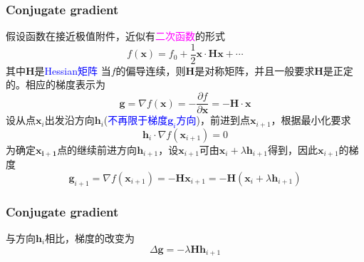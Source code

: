 {\frame
{
	\frametitle{\textrm{Conjugate gradient}}
	假设函数在接近极值附件，近似有\textcolor{magenta}{二次函数}的形式
	\begin{displaymath}
		f(\mathbf{x})=f_0+\frac12\mathbf{x}\cdot\mathbf{H}{\mathbf{x}}+\cdots
	\end{displaymath}
	其中$\mathbf{H}$是\textcolor{blue}{\textrm{Hessian}矩阵}%
	当$f$的偏导连续，则$\mathbf{H}$是对称矩阵，并且一般要求$\mathbf{H}$是正定的。相应的梯度表示为
	\begin{displaymath}
		\mathbf{g}=\nabla f(\mathbf{x})=-\dfrac{\partial f}{\partial\mathbf{x}}=-\mathbf{H}\cdot\mathbf{x}
	\end{displaymath}
	\vskip 20pt
	设从点$\mathbf{x}_i$出发沿方向$\mathbf{h}_i$(\textcolor{blue}{不再限于梯度$\mathbf{g}_i$方向})，前进到点$\mathbf{x}_{i+1}$，根据最小化要求
	\begin{displaymath}
		\mathbf{h}_i\cdot\nabla f(\mathbf{x}_{i+1})=0
	\end{displaymath}
	为确定$\mathbf{x_{i+1}}$点的继续前进方向$\mathbf{h}_{i+1}$，设$\mathbf{x}_{i+1}$可由$\mathbf{x}_i+\lambda\mathbf{h}_{i+1}$得到，因此$\mathbf{x}_{i+1}$的梯度
	\begin{displaymath}
		\mathbf{g}_{i+1}=\nabla f(\mathbf{x}_{i+1})=-\mathbf{H}\mathbf{x}_{i+1}=-\mathbf{H}(\mathbf{x}_{i}+\lambda\mathbf{h}_{i+1})
	\end{displaymath}
}

\frame
{
	\frametitle{\textrm{Conjugate gradient}}
	与方向$\mathbf{h}_i$相比，梯度的改变为
	\begin{displaymath}
		\Delta\mathbf{g}=-\lambda\mathbf{H}\mathbf{h}_{i+1}
	\end{displaymath}

}}

